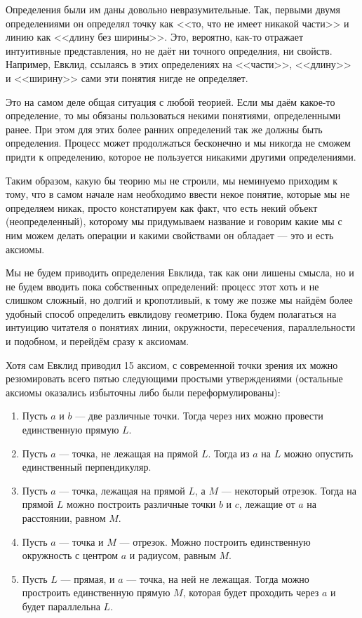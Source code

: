 Определения были им даны довольно невразумительные. Так, первыми двумя определениями он определял точку как <<то, что не имеет никакой части>> и линию как <<длину без ширины>>. Это, вероятно, как-то отражает интуитивные представления, но не даёт ни точного определния, ни свойств. Например, Евклид, ссылаясь в этих определениях на <<части>>, <<длину>> и <<ширину>> сами эти понятия нигде не определяет.

Это на самом деле общая ситуация с любой теорией. Если мы даём какое-то определение, то мы обязаны пользоваться некими понятиями, определенными ранее. При этом для этих более ранних определений так же должны быть определения. Процесс может продолжаться бесконечно и мы никогда не сможем придти к определению, которое не пользуется никакими другими определениями.

Таким образом, какую бы теорию мы не строили, мы неминуемо приходим к тому, что в самом начале нам необходимо ввести некое понятие, которые мы не определяем никак, просто констатируем как факт, что есть некий объект (неопределенный), которому мы придумываем название и говорим какие мы с ним можем делать операции и какими свойствами он обладает --- это и есть аксиомы.

Мы не будем приводить определения Евклида, так как они лишены смысла, но и не будем вводить пока собственных определений: процесс этот хоть и не слишком сложный, но долгий и кропотливый, к тому же позже мы найдём более удобный способ определить евклидову геометрию. Пока будем полагаться на интуицию читателя о понятиях линии, окружности, пересечения, параллельности и подобном, и перейдём сразу к аксиомам.

Хотя сам Евклид приводил 15 аксиом, с современной точки зрения их можно резюмировать всего пятью следующими простыми утверждениями (остальные аксиомы оказались избыточны либо были переформулированы):

\begin{enumerate}
\item Пусть $a$ и $b$ --- две различные точки. Тогда через них можно провести единственную прямую $L$.
\item Пусть $a$ --- точка, не лежащая на прямой $L$. Тогда из $a$ на $L$ можно опустить единственный перпендикуляр.
\item Пусть $a$ --- точка, лежащая на прямой $L$, а $M$ --- некоторый отрезок. Тогда на прямой $L$ можно построить различные точки $b$ и $c$, лежащие от $a$ на расстоянии, равном $M$.
\item Пусть $a$ --- точка и $M$ --- отрезок. Можно построить единственную окружность с центром $a$ и радиусом, равным $M$.
\item Пусть $L$ --- прямая, и $a$ --- точка, на ней не лежащая. Тогда можно простроить единственную прямую $M$, которая будет проходить через $a$ и будет параллельна $L$.
\end{enumerate}

